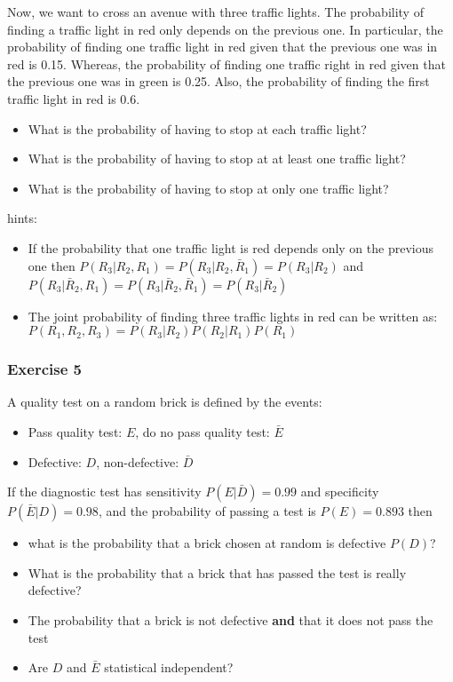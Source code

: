 \documentclass[
]{book}
\providecommand{\tightlist}{%
  \setlength{\itemsep}{0pt}\setlength{\parskip}{0pt}}
\begin{document}
Now, we want to cross an avenue with three traffic lights. The probability of finding a traffic light in red only depends on the previous one. In particular, the probability of finding one traffic light in red given that the previous one was in red is 0.15. Whereas, the probability of finding one traffic right in red given that the previous one was in green is 0.25. Also, the probability of finding the first traffic light in red is 0.6.

\begin{itemize}
\tightlist
\item
  What is the probability of having to stop at each traffic light?
\item
  What is the probability of having to stop at at least one traffic light?
\item
  What is the probability of having to stop at only one traffic light?
\end{itemize}

hints:

\begin{itemize}
\item
  If the probability that one traffic light is red depends only on the previous one then
  \(P(R_3|R_2,R_1)=P(R_3|R_2,\bar{R}_1)=P(R_3|R_2)\) and \(P(R_3|\bar{R}_2,R_1)=P(R_3|\bar{R}_2,\bar{R}_1)=P(R_3|\bar{R}_2)\)
\item
  The joint probability of finding three traffic lights in red can be written as:
  \(P(R_1,R_2,R_3)=P(R_3|R_2)P(R_2|R_1)P(R_1)\)
\end{itemize}

\hypertarget{exercise-5}{%
\subsubsection{Exercise 5}\label{exercise-5}}

A quality test on a random brick is defined by the events:

\begin{itemize}
\tightlist
\item
  Pass quality test: \(E\), do no pass quality test: \(\bar{E}\)
\item
  Defective: \(D\), non-defective: \(\bar{D}\)
\end{itemize}

If the diagnostic test has sensitivity \(P(E|\bar{D})=0.99\) and specificity \(P(\bar{E}|D)=0.98\), and the probability of passing a test is \(P(E)=0.893\) then

\begin{itemize}
\item
  what is the probability that a brick chosen at random is defective \(P(D)\)?
\item
  What is the probability that a brick that has passed the test is really defective?
\item
  The probability that a brick is not defective \textbf{and} that it does not pass the test
\item
  Are \(D\) and \(\bar{E}\) statistical independent?
\end{itemize}
\end{document}
